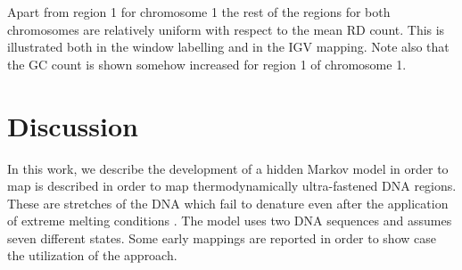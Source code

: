 \documentclass[12pt]{article}
\begin{document}


	
	

Apart from region 1 for chromosome 1 the rest of the regions for both chromosomes are relatively uniform with respect to the mean RD count. This is illustrated both in the window labelling and in the IGV mapping. Note also that the GC count is shown somehow increased for region 1 of chromosome 1.  

\clearpage


\section{Discussion}
\label{discussion}

In this work, we describe the development of a hidden Markov model in order to map  is described in order to map thermodynamically ultra-fastened DNA regions. These  are stretches of the DNA which fail to denature even after the application of extreme melting conditions \cite{veal2012}. The model uses two DNA sequences and assumes seven different states. Some early mappings are reported in order to show case the utilization of the approach.
\end{document}
